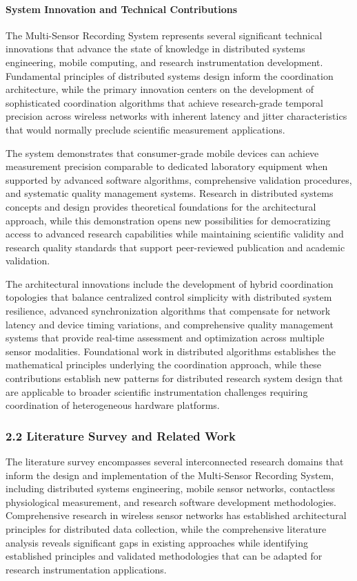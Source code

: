 \documentclass[12pt,a4paper]{report}
\begin{document}
\paragraph{System Innovation and Technical Contributions}

The Multi-Sensor Recording System represents several significant technical innovations that advance the state of
knowledge in distributed systems engineering, mobile computing, and research instrumentation development. Fundamental
principles of distributed systems design inform the coordination architecture, while the primary innovation centers on
the development of sophisticated coordination algorithms that achieve research-grade temporal precision across wireless
networks with inherent latency and jitter characteristics that would normally preclude scientific measurement
applications.

The system demonstrates that consumer-grade mobile devices can achieve measurement precision comparable to dedicated
laboratory equipment when supported by advanced software algorithms, comprehensive validation procedures, and systematic
quality management systems. Research in distributed systems concepts and design provides theoretical foundations for the
architectural approach, while this demonstration opens new possibilities for democratizing access to advanced research
capabilities while maintaining scientific validity and research quality standards that support peer-reviewed publication
and academic validation.

The architectural innovations include the development of hybrid coordination topologies that balance centralized control
simplicity with distributed system resilience, advanced synchronization algorithms that compensate for network latency
and device timing variations, and comprehensive quality management systems that provide real-time assessment and
optimization across multiple sensor modalities. Foundational work in distributed algorithms establishes the mathematical
principles underlying the coordination approach, while these contributions establish new patterns for distributed
research system design that are applicable to broader scientific instrumentation challenges requiring coordination of
heterogeneous hardware platforms.

\subsubsection{2.2 Literature Survey and Related Work}

The literature survey encompasses several interconnected research domains that inform the design and implementation of
the Multi-Sensor Recording System, including distributed systems engineering, mobile sensor networks, contactless
physiological measurement, and research software development methodologies. Comprehensive research in wireless sensor
networks has established architectural principles for distributed data collection, while the comprehensive literature
analysis reveals significant gaps in existing approaches while identifying established principles and validated
methodologies that can be adapted for research instrumentation applications.
\end{document}
